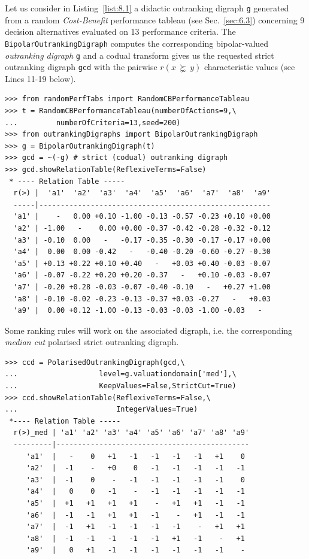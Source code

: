 Let us consider in Listing~\vref{list:8.1} a didactic outranking digraph \texttt{g} generated from a random \emph{Cost-Benefit} performance tableau (see Sec.~\ref{sec:6.3}) concerning 9 decision alternatives evaluated on 13 performance criteria. The \texttt{BipolarOutrankingDigraph} computes the corresponding bipolar-valued \emph{outranking digraph} \texttt{g} and a codual transform gives us the requested strict outranking digraph \texttt{gcd} with the pairwise $r(x\, \succnsim \, y)$ characteristic values (see Lines 11-19 below).
\begin{lstlisting}[caption={Random bipolar-valued strict outranking relation characteristics},label=list:8.1]
>>> from randomPerfTabs import RandomCBPerformanceTableau   
>>> t = RandomCBPerformanceTableau(numberOfActions=9,\
...         numberOfCriteria=13,seed=200)
>>> from outrankingDigraphs import BipolarOutrankingDigraph
>>> g = BipolarOutrankingDigraph(t)
>>> gcd = ~(-g) # strict (codual) outranking digraph
>>> gcd.showRelationTable(ReflexiveTerms=False)
 * ---- Relation Table -----
  r(>) |  'a1'  'a2'  'a3'  'a4'  'a5'  'a6'  'a7'  'a8'  'a9'   
  -----|------------------------------------------------------
  'a1' |    -   0.00 +0.10 -1.00 -0.13 -0.57 -0.23 +0.10 +0.00  
  'a2' | -1.00   -    0.00 +0.00 -0.37 -0.42 -0.28 -0.32 -0.12  
  'a3' | -0.10  0.00   -   -0.17 -0.35 -0.30 -0.17 -0.17 +0.00  
  'a4' |  0.00  0.00 -0.42   -   -0.40 -0.20 -0.60 -0.27 -0.30  
  'a5' | +0.13 +0.22 +0.10 +0.40   -   +0.03 +0.40 -0.03 -0.07  
  'a6' | -0.07 -0.22 +0.20 +0.20 -0.37   -   +0.10 -0.03 -0.07  
  'a7' | -0.20 +0.28 -0.03 -0.07 -0.40 -0.10   -   +0.27 +1.00  
  'a8' | -0.10 -0.02 -0.23 -0.13 -0.37 +0.03 -0.27   -   +0.03  
  'a9' |  0.00 +0.12 -1.00 -0.13 -0.03 -0.03 -1.00 -0.03   -   
\end{lstlisting}
  
Some ranking rules will work on the associated \Condorcet digraph, i.e. the corresponding \emph{median cut} polarised strict outranking digraph.
 \begin{lstlisting}[caption={Median cut polarised strict outranking relation characteristics},label=list:8.2]
>>> ccd = PolarisedOutrankingDigraph(gcd,\
...                   level=g.valuationdomain['med'],\
...                   KeepValues=False,StrictCut=True)
>>> ccd.showRelationTable(ReflexiveTerms=False,\
...                       IntegerValues=True)
 *---- Relation Table -----
  r(>)_med | 'a1' 'a2' 'a3' 'a4' 'a5' 'a6' 'a7' 'a8' 'a9'   
  ---------|---------------------------------------------
     'a1'  |   -    0   +1   -1   -1   -1   -1   +1    0  
     'a2'  |  -1    -   +0    0   -1   -1   -1   -1   -1  
     'a3'  |  -1    0    -   -1   -1   -1   -1   -1    0  
     'a4'  |   0    0   -1    -   -1   -1   -1   -1   -1  
     'a5'  |  +1   +1   +1   +1    -   +1   +1   -1   -1  
     'a6'  |  -1   -1   +1   +1   -1    -   +1   -1   -1  
     'a7'  |  -1   +1   -1   -1   -1   -1    -   +1   +1  
     'a8'  |  -1   -1   -1   -1   -1   +1   -1    -   +1  
     'a9'  |   0   +1   -1   -1   -1   -1   -1   -1    -   
\end{lstlisting}

